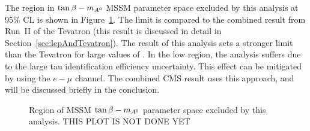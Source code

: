 The region in $\tb-\ma$ MSSM parameter space excluded by this analysis at 95\%
CL is shown in Figure~\ref{fig:TanBetaLimit}.  The limit is compared to the
combined result from \mbox{Run II} of the Tevatron (this result is discussed in
detail in Section~\ref{sec:lepAndTevatron}).  The result of this analysis sets a
stronger limit  than the Tevatron for large values of \ma.
In the low \ma region, the analysis suffers due to the large tau identification
efficiency uncertainty.  This effect can be mitigated by using the $e-\mu$
channel.  The combined CMS result uses this approach, and will be discussed
briefly in the conclusion.
\begin{figure}[htb]
  \centering
  \vspace{3in}
  \label{fig:TanBetaLimit} 
  \caption[Excluded regions of MSSM $\tb-\ma$ parameter space]{Region of MSSM
  $\tb-\ma$ parameter space excluded by this analysis. THIS PLOT IS NOT DONE YET}
\end{figure}


\ifx\master\undefined\fi
